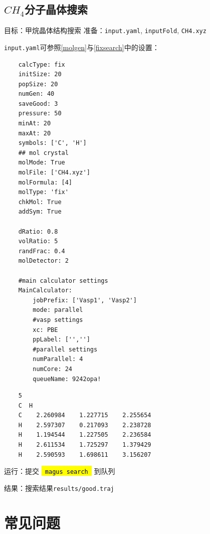 \documentclass[12pt]{article}
\newcommand{\code}[1]{
  \begingroup
  \sethlcolor{Seashell}
  {\hl{\texttt{~#1~}}}
  \endgroup
}
\newcommand{\file}[1]{\texttt{#1}}
\begin{document}
\subsection{\texorpdfstring{$CH_4$分子晶体搜索}{CH4分子晶体搜索}}
目标：甲烷晶体结构搜索
准备：\file{input.yaml}, \file{inputFold}, \file{CH4.xyz}\par
\file{input.yaml}可参照\ref{molgen}与\ref{fixsearch}中的设置：
\begin{tcolorbox}[enhanced, breakable, title=\file{MTP/pot.mtp}]
\begin{verbatim} 
    calcType: fix                                                              
    initSize: 20
    popSize: 20
    numGen: 40
    saveGood: 3
    pressure: 50
    minAt: 20
    maxAt: 20
    symbols: ['C', 'H']
    ## mol crystal
    molMode: True
    molFile: ['CH4.xyz']
    molFormula: [4] 
    molType: 'fix'
    chkMol: True
    addSym: True
    
    dRatio: 0.8 
    volRatio: 5
    randFrac: 0.4 
    molDetector: 2
    
    #main calculator settings
    MainCalculator:
        jobPrefix: ['Vasp1', 'Vasp2']
        mode: parallel
        #vasp settings
        xc: PBE 
        ppLabel: ['','']
        #parallel settings
        numParallel: 4
        numCore: 24
        queueName: 9242opa!
\end{verbatim}
\end{tcolorbox}
\begin{tcolorbox}[enhanced, breakable, title=\file{MTP/pot.mtp}]
    \begin{verbatim} 
    5                                                                          
    C  H   
    C    2.260984    1.227715    2.255654
    H    2.597307    0.217093    2.238728
    H    1.194544    1.227505    2.236584
    H    2.611534    1.725297    1.379429
    H    2.590593    1.698611    3.156207
    \end{verbatim}
\end{tcolorbox}
运行：提交\code{magus search} 到队列\par
结果：搜索结果\file{results/good.traj}
\newpage
\section{常见问题}
\end{document}
